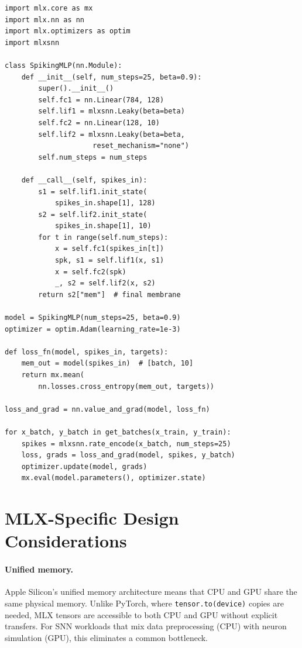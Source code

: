 \documentclass[11pt]{article}
\begin{document}
\begin{lstlisting}[caption={Simplified mlx-snn training loop for MNIST classification. \texttt{SpikingMLP} wraps two \texttt{nn.Linear} layers and two \texttt{mlxsnn.Leaky} neurons in a 784--128--10 feedforward architecture. Hyperparameters shown are for illustration; see Table~\ref{tab:mnist} for tuned configurations.}, label={lst:training}]
import mlx.core as mx
import mlx.nn as nn
import mlx.optimizers as optim
import mlxsnn

class SpikingMLP(nn.Module):
    def __init__(self, num_steps=25, beta=0.9):
        super().__init__()
        self.fc1 = nn.Linear(784, 128)
        self.lif1 = mlxsnn.Leaky(beta=beta)
        self.fc2 = nn.Linear(128, 10)
        self.lif2 = mlxsnn.Leaky(beta=beta,
                     reset_mechanism="none")
        self.num_steps = num_steps

    def __call__(self, spikes_in):
        s1 = self.lif1.init_state(
            spikes_in.shape[1], 128)
        s2 = self.lif2.init_state(
            spikes_in.shape[1], 10)
        for t in range(self.num_steps):
            x = self.fc1(spikes_in[t])
            spk, s1 = self.lif1(x, s1)
            x = self.fc2(spk)
            _, s2 = self.lif2(x, s2)
        return s2["mem"]  # final membrane

model = SpikingMLP(num_steps=25, beta=0.9)
optimizer = optim.Adam(learning_rate=1e-3)

def loss_fn(model, spikes_in, targets):
    mem_out = model(spikes_in)  # [batch, 10]
    return mx.mean(
        nn.losses.cross_entropy(mem_out, targets))

loss_and_grad = nn.value_and_grad(model, loss_fn)

for x_batch, y_batch in get_batches(x_train, y_train):
    spikes = mlxsnn.rate_encode(x_batch, num_steps=25)
    loss, grads = loss_and_grad(model, spikes, y_batch)
    optimizer.update(model, grads)
    mx.eval(model.parameters(), optimizer.state)
\end{lstlisting}

\section{MLX-Specific Design Considerations}

\paragraph{Unified memory.}
Apple Silicon's unified memory architecture means that CPU and GPU share the same physical memory. Unlike PyTorch, where \texttt{tensor.to(device)} copies are needed, MLX tensors are accessible to both CPU and GPU without explicit transfers. For SNN workloads that mix data preprocessing (CPU) with neuron simulation (GPU), this eliminates a common bottleneck.
\end{document}

